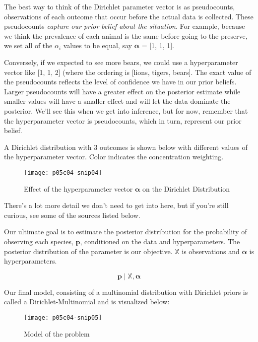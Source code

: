 The best way to think of the Dirichlet parameter vector is as pseudocounts, observations of each outcome that occur before the actual data is collected. These pseudocounts \textit{capture our prior belief about the situation}. For example, because we think the prevalence of each animal is the same before going to the preserve, we set all of the $\alpha_i $ values to be equal, say  $\boldsymbol {\alpha }$ = [1, 1, 1].

Conversely, if we expected to see more bears, we could use a hyperparameter vector like [1, 1, 2] (where the ordering is [lions, tigers, bears]. The exact value of the pseudocounts reflects the level of confidence we have in our prior beliefs. Larger pseudocounts will have a greater effect on the posterior estimate while smaller values will have a smaller effect and will let the data dominate the posterior. We'll see this when we get into inference, but for now, remember that the hyperparameter vector is pseudocounts, which in turn, represent our prior belief.

A Dirichlet distribution with 3 outcomes is shown below \cite{FrancisTsengBayesianLearning2019} with different values of the hyperparameter vector. Color indicates the concentration weighting.

    \begin{figure*}[h]
        \texttt{[image: p05c04-snip04]}
        \caption{Effect of the hyperparameter vector $\boldsymbol {\alpha }$ on the Dirichlet Distribution}
    \end{figure*}

There's a lot more detail we don't need to get into here, but if you're still curious, see some of the sources listed below.

Our ultimate goal is to estimate the posterior distribution for the probability of observing each species, $\mathbf {p}$, conditioned on the data and hyperparameters. The posterior distribution of the parameter is our objective. $\mathbb {X}$ is observations and $\boldsymbol {\alpha }$ is hyperparameters.

\begin{equation}
    \mathbf {p}\mid \mathbb {X} ,{\boldsymbol {\alpha }}
\end{equation}

Our final model, consisting of a multinomial distribution with Dirichlet priors is called a Dirichlet-Multinomial and is visualized below:

\begin{figure*}[h]
    \texttt{[image: p05c04-snip05]}
    \caption{Model of the problem}
\end{figure*}

